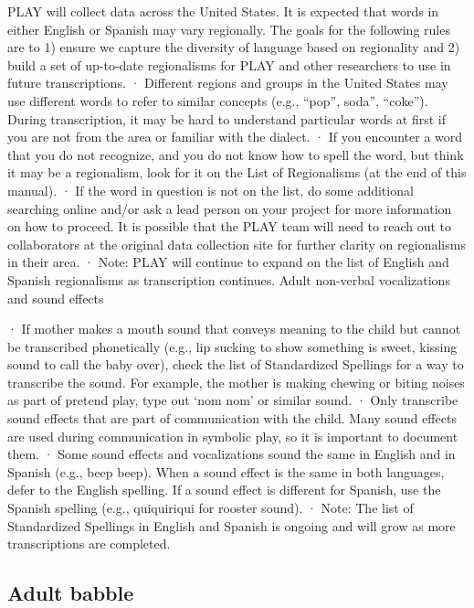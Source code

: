 \documentclass[
]{book}
\begin{document}
PLAY will collect data across the United States. It is expected that words in either English or Spanish may vary regionally. The goals for the following rules are to 1) ensure we capture the diversity of language based on regionality and 2) build a set of up-to-date regionalisms for PLAY and other researchers to use in future transcriptions.
· Different regions and groups in the United States may use different words to refer to similar concepts (e.g., ``pop'', soda'', ``coke''). During transcription, it may be hard to understand particular words at first if you are not from the area or familiar with the dialect.
· If you encounter a word that you do not recognize, and you do not know how to spell the word, but think it may be a regionalism, look for it on the List of Regionalisms (at the end of this manual).
· If the word in question is not on the list, do some additional searching online and/or ask a lead person on your project for more information on how to proceed. It is possible that the PLAY team will need to reach out to collaborators at the original data collection site for further clarity on regionalisms in their area.
· Note: PLAY will continue to expand on the list of English and Spanish regionalisms as transcription continues.
Adult non-verbal vocalizations and sound effects

· If mother makes a mouth sound that conveys meaning to the child but cannot be transcribed phonetically (e.g., lip sucking to show something is sweet, kissing sound to call the baby over), check the list of Standardized Spellings for a way to transcribe the sound. For example, the mother is making chewing or biting noises as part of pretend play, type out `nom nom' or similar sound.
· Only transcribe sound effects that are part of communication with the child. Many sound effects are used during communication in symbolic play, so it is important to document them.
· Some sound effects and vocalizations sound the same in English and in Spanish (e.g., beep beep). When a sound effect is the same in both languages, defer to the English spelling. If a sound effect is different for Spanish, use the Spanish spelling (e.g., quiquiriqui for rooster sound).
· Note: The list of Standardized Spellings in English and Spanish is ongoing and will grow as more transcriptions are completed.

\hypertarget{adult-babble}{%
\subsection{Adult babble}\label{adult-babble}}
\end{document}
